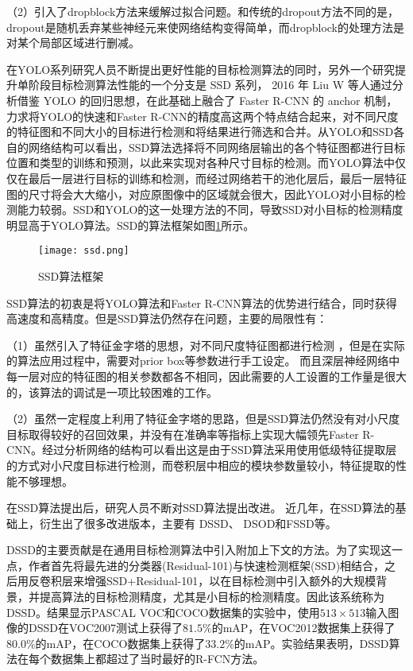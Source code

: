 （2）引入了dropblock方法\cite{ghiasi2018dropblock}来缓解过拟合问题。和传统的dropout方法不同的是，dropout是随机丢弃某些神经元来使网络结构变得简单，而dropblock的处理方法是对某个局部区域进行删减。

在YOLO系列研究人员不断提出更好性能的目标检测算法的同时，另外一个研究提升单阶段目标检测算法性能的一个分支是 SSD 系列， 2016 年 Liu W 等人通过分析借鉴 YOLO 的回归思想，在此基础上融合了 Faster R-CNN 的 anchor 机制，力求将YOLO的快速和Faster R-CNN的精度高这两个特点结合起来，对不同尺度的特征图和不同大小的目标进行检测和将结果进行筛选和合并。从YOLO和SSD各自的网络结构可以看出，SSD算法选择将不同网络层输出的各个特征图都进行目标位置和类型的训练和预测，以此来实现对各种尺寸目标的检测。而YOLO算法中仅仅在最后一层进行目标的训练和检测，而经过网络若干的池化层后，最后一层特征图的尺寸将会大大缩小，对应原图像中的区域就会很大，因此YOLO对小目标的检测能力较弱。SSD和YOLO的这一处理方法的不同，导致SSD对小目标的检测精度明显高于YOLO算法。SSD的算法框架如图\ref{ssd}所示。

\begin{figure}[htbp]
    \centering
    \texttt{[image: ssd.png]}
    \caption{SSD算法框架}
    \label{ssd}
\end{figure}

SSD算法的初衷是将YOLO算法和Faster R-CNN算法的优势进行结合，同时获得高速度和高精度。但是SSD算法仍然存在问题，主要的局限性有：

（1）虽然引入了特征金字塔的思想，对不同尺度特征图都进行检测
，但是在实际的算法应用过程中，需要对prior box等参数进行手工设定。
而且深层神经网络中每一层对应的特征图的相关参数都各不相同，因此需要的人工设置的工作量是很大的，该算法的调试是一项比较困难的工作。

（2）虽然一定程度上利用了特征金字塔的思路，但是SSD算法仍然没有对小尺度目标取得较好的召回效果，并没有在准确率等指标上实现大幅领先Faster R-CNN。经过分析网络的结构可以看出这是由于SSD算法采用使用低级特征提取层的方式对小尺度目标进行检测，而卷积层中相应的模块参数量较小，特征提取的性能不够理想。

在SSD算法提出后，研究人员不断对SSD算法提出改进。
近几年，在SSD算法的基础上，衍生出了很多改进版本，主要有 DSSD\cite{fu2017dssd}、
DSOD\cite{shen2017dsod}和FSSD\cite{li2017fssd}等。

DSSD的主要贡献是在通用目标检测算法中引入附加上下文的方法。为了实现这一点，作者首先将最先进的分类器(Residual-101)与快速检测框架(SSD)相结合，之后用反卷积层来增强SSD+Residual-101，以在目标检测中引入额外的大规模背景，并提高算法的目标检测精度，尤其是小目标的检测精度。因此该系统称为DSSD。结果显示PASCAL VOC和COCO数据集的实验中，使用$513 \times513$输入图像的DSSD在VOC2007测试上获得了$81.5\%$的mAP，在VOC2012数据集上获得了$80.0\%$的mAP，在COCO数据集上获得了$33.2\%$的mAP。实验结果表明，DSSD算法在每个数据集上都超过了当时最好的R-FCN方法。

